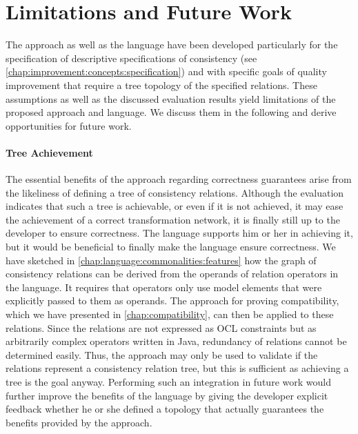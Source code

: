 \section{Limitations and Future Work}

The \commonalities approach as well as the \commonalities language have been developed particularly for the specification of descriptive specifications of consistency (see \autoref{chap:improvement:concepts:specification}) and with specific goals of quality improvement that require a tree topology of the specified relations.
These assumptions as well as the discussed evaluation results yield limitations of the proposed approach and language.
We discuss them in the following and derive opportunities for future work.

\paragraph{Tree Achievement}
The essential benefits of the \commonalities approach regarding correctness guarantees arise from the likeliness of defining a tree of consistency relations.
Although the evaluation indicates that such a tree is achievable, or even if it is not achieved, it may ease the achievement of a correct transformation network, it is finally still up to the developer to ensure correctness.
The language supports him or her in achieving it, but it would be beneficial to finally make the language ensure correctness.
We have sketched in \autoref{chap:language:commonalities:features} how the graph of consistency relations can be derived from the operands of relation operators in the \commonalities language.
It requires that operators only use model elements that were explicitly passed to them as operands.
The approach for proving compatibility, which we have presented in \autoref{chap:compatibility}, can then be applied to these relations.
Since the relations are not expressed as \gls{OCL} constraints but as arbitrarily complex operators written in Java, redundancy of relations cannot be determined easily.
Thus, the approach may only be used to validate if the relations represent a consistency relation tree, but this is sufficient as achieving a tree is the goal anyway.
Performing such an integration in future work would further improve the benefits of the language by giving the developer explicit feedback whether he or she defined a topology that actually guarantees the benefits provided by the \commonalities approach.

